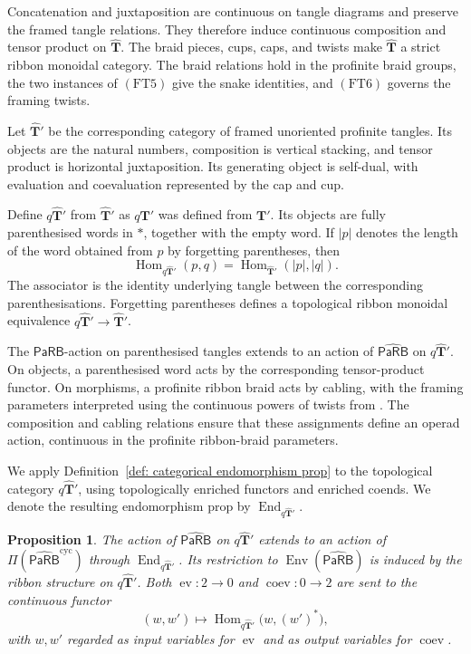\documentclass{amsart}
\newcommand{\bT}{\mathbf{T}}
\newcommand{\PaRB}{\mathsf{PaRB}}
\newcommand{\End}{\operatorname{End}}
\newcommand{\Hom}{\operatorname{Hom}}
\newcommand{\ev}{\operatorname{ev}}
\newcommand{\coev}{\operatorname{coev}}
\newcommand{\Env}{\operatorname{Env}}
\newtheorem{prop}[theorem]{Proposition}%
\theoremstyle{definition}
\numberwithin{equation}{section}
\begin{document}
Concatenation and juxtaposition are continuous on tangle diagrams
and preserve the framed tangle relations. They therefore induce
continuous composition and tensor product on $\widehat{\bT}$.
The braid pieces, cups, caps, and twists make $\widehat{\bT}$
a strict ribbon monoidal category. The braid relations hold in
the profinite braid groups, the two instances of $\mathrm{(FT5)}$
give the snake identities, and $\mathrm{(FT6)}$ governs the
framing twists.

Let $\widehat{\bT}'$ be the corresponding category of framed
unoriented profinite tangles. Its objects are the natural numbers,
composition is vertical stacking, and tensor product is horizontal
juxtaposition. Its generating object is self-dual, with evaluation
and coevaluation represented by the cap and cup.

Define $q\widehat{\bT}'$ from $\widehat{\bT}'$ as $q\bT'$ was
defined from $\bT'$. Its objects are fully parenthesised words in
$*$, together with the empty word. If $|p|$ denotes the length of
the word obtained from $p$ by forgetting parentheses, then
\[
\Hom_{q\widehat{\bT}'}(p,q)
=
\Hom_{\widehat{\bT}'}(|p|,|q|).
\]
The associator is the identity underlying tangle between the
corresponding parenthesisations. Forgetting parentheses defines
a topological ribbon monoidal equivalence
$q\widehat{\bT}'\to\widehat{\bT}'$.

The $\PaRB$-action on parenthesised tangles extends to an
action of $\widehat{\PaRB}$ on $q\widehat{\bT}'$.
On objects, a parenthesised word acts by the corresponding
tensor-product functor. On morphisms, a profinite ribbon braid
acts by cabling, with the framing parameters interpreted using
the continuous powers of twists from
\cite[Lemma~B.9]{furusho_galois_2017}.
The composition and cabling relations ensure that these
assignments define an operad action, continuous in the
profinite ribbon-braid parameters.

We apply Definition~\ref{def: categorical endomorphism prop}
to the topological category $q\widehat{\bT}'$, using
topologically enriched functors and enriched coends.
We denote the resulting endomorphism prop by
$\End_{q\widehat{\bT}'}$.

\begin{prop}
\label{prop: profinite metric prop action through cyclic endomorphisms}
The action of $\widehat{\PaRB}$ on $q\widehat{\bT}'$
extends to an action of
$\Pi(\widehat{\PaRB}^{\mathrm{cyc}})$ through
$\End_{q\widehat{\bT}'}$.
Its restriction to $\Env(\widehat{\PaRB})$ is induced by the
ribbon structure on $q\widehat{\bT}'$. Both $\ev\colon 2\to 0$
and $\coev\colon 0\to 2$ are sent to the continuous functor
\[
(w,w')\longmapsto
\Hom_{q\widehat{\bT}'}\bigl(w,(w')^*\bigr),
\]
with $w,w'$ regarded as input variables for $\ev$ and as output
variables for $\coev$.
\end{prop}
\end{document}
